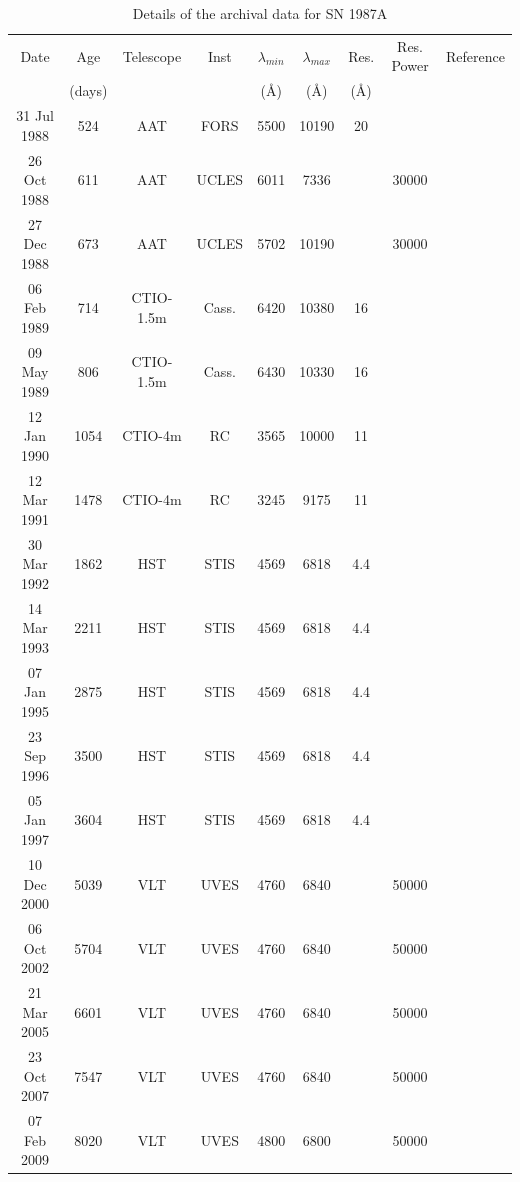 \documentclass[useAMS,usenatbib,usegraphicx]{mnras}
\begin{document}
\begin{table}
	\begin{minipage}{180mm}
	\caption{Details of the archival data for SN 1987A}
	\label{tb:data}
  	\begin{tabular}{@{} ccccccccl @{}}
    	\hline
	Date & Age & Telescope  & Inst & $\lambda_{min}$ & $\lambda_{max}$ & Res. & Res. Power & Reference \\
	& (days) & & &(\AA) & (\AA)& (\AA)\\
	\hline
31 Jul 1988 & 524 & AAT & FORS & 5500 & 10190 & 20 & & \citet{Spyromilio1991} \\
26 Oct 1988 & 611 & AAT & UCLES & 6011 & 7336 &  & 30000 & \citet{Hanuschik1993, Spyromilio1993}\\
27 Dec 1988 & 673 & AAT & UCLES & 5702 & 10190 &  & 30000 & \citet{Hanuschik1993, Spyromilio1993}\\
06 Feb 1989 & 714 & CTIO-1.5m & Cass. & 6420 & 10380 & 16 & & \citet{Phillips1990}\\
09 May 1989 & 806 & CTIO-1.5m & Cass. & 6430 & 10330 & 16 & & \citet{Phillips1990}\\
12 Jan 1990 & 1054 & CTIO-4m & RC & 3565 & 10000 & 11 & & \cite{Suntzeff1991} \\
12 Mar 1991 & 1478 & CTIO-4m & RC & 3245 & 9175 & 11 & & \cite{} \\
30 Mar 1992 & 1862 & HST & STIS & 4569 & 6818 & 4.4 &  & \citet{Wang1996}\\
14 Mar 1993 & 2211 & HST & STIS & 4569 & 6818 & 4.4 &  & \citet{Wang1996}\\
07 Jan 1995 & 2875 & HST & STIS & 4569 & 6818 & 4.4 &  & \citet{Chugai1997}\\
23 Sep 1996 & 3500 & HST & STIS & 4569 & 6818 & 4.4 &  \\ 
05 Jan 1997 & 3604 & HST & STIS & 4569 & 6818 & 4.4 &  \\
10 Dec 2000 & 5039 & VLT & UVES & 4760 & 6840 &  & 50000 & \citet{Groeningsson2006, Groeningsson2007}\\
06 Oct 2002 & 5704 & VLT & UVES & 4760 & 6840 &  & 50000 & \citet{Groeningsson2006, Groeningsson2007, Groningsson2008}\\
21 Mar 2005 & 6601 & VLT & UVES & 4760 & 6840 &  & 50000 &\citet{Groeningsson2006, Groeningsson2007}\\
23 Oct 2007 & 7547 & VLT & UVES & 4760 & 6840 &  & 50000 & \citet{Groeningsson2007}\\
07 Feb 2009 & 8020 & VLT & UVES & 4800 & 6800 &  & 50000 & \citet{Tziamtzis2010}\\
    \hline
  \end{tabular}
\end{minipage}
\end{table}
\end{document}
